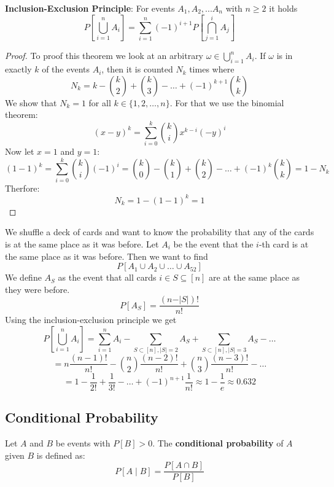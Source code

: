 \begin{theorem}
	\textbf{Inclusion-Exclusion Principle}: For events $A_1, A_2, ... A_n$ with $n \geq 2$ it holds
	$$P[\bigcup_{i=1}^n A_i] = \sum_{i=1}^n (-1)^{i+1} P[\bigcap_{j=1}^i A_j]$$
\end{theorem}

\begin{proof}
	To proof this theorem we look at an arbitrary $\omega \in \bigcup_{i=1}^n A_i$. If $\omega$ is in exactly
	$k$ of the events $A_i$, then it is counted $N_k$ times where
	$$N_k = k - \binom{k}{2} + \binom{k}{3} - \dots + (-1)^{k+1} \binom{k}{k}$$
	We show that $N_k = 1$ for all $k \in \{1, 2, \dots, n\}$. For that we use the binomial theorem:
	$$(x-y)^k = \sum_{i=0}^k \binom{k}{i} x^{k-i} (-y)^i$$
	Now let $x=1$ and $y=1$:
	$$(1-1)^k = \sum_{i=0}^k \binom{k}{i} (-1)^i = \binom{k}{0} - \binom{k}{1} + \binom{k}{2} - \dots + (-1)^k
		\binom{k}{k} = 1- N_k$$
	Therfore:
	$$N_k = 1 - (1-1)^k = 1$$
\end{proof}

\begin{example}
	We shuffle a deck of cards and want to know the probability that any of the cards is at the same place as it was before.
	Let $A_i$ be the event that the $i$-th card is at the same place as it was before. Then we want to find
	$$P[A_1 \cup A_2 \cup \dots \cup A_{52}]$$
	We define $A_S$ as the event that all cards $i \in S \subseteq[n]$ are at the same place as they were before.
	$$P[A_S] = \frac{(n - \vert S \vert)!}{n!}$$
	Using the inclusion-exclusion principle we get
	$$P[\bigcup_{i=1}^n A_i] = \sum_{i=1}^n A_i - \sum_{S \subset [n], \vert S \vert = 2} A_S + \sum_{S \subset [n], \vert S \vert = 3} A_S - \dots$$
	$$= n \frac{(n-1)!}{n!} - \binom{n}{2} \frac{(n-2)!}{n!} + \binom{n}{3} \frac{(n-3)!}{n!} - \dots$$
	$$= 1 - \frac{1}{2!} + \frac{1}{3!} - \dots + (-1)^{n+1} \frac{1}{n!} \approx 1 - \frac{1}{e} \approx 0.632$$
\end{example}

\subsection{Conditional Probability}

\begin{definition}
	Let $A$ and $B$ be events with $P[B] > 0$. The \textbf{conditional probability} of $A$ given $B$ is defined as:
	$$P[A \mid B] = \frac{P[A \cap B]}{P[B]}$$
\end{definition}

